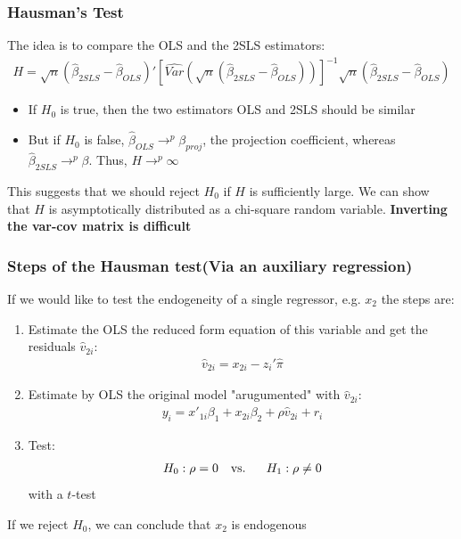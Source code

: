\documentclass[a4paper,twoside,11pt]{article}
\begin{document}
\subsubsection{Hausman's Test}
The idea is to compare the OLS and the 2SLS estimators:
\begin{equation*}
\begin{aligned}
H = \sqrt{n}(\hat{\beta}_{2SLS} - \hat{\beta}_{OLS})' [\widehat{Var}(\sqrt{n} (\hat{\beta}_{2SLS} - \hat{\beta}_{OLS}))]^{-1} \sqrt{n} (\hat{\beta}_{2SLS} - \hat{\beta}_{OLS})
\end{aligned} 
\end{equation*}
\begin{itemize}
    \item If $H_0$ is true, then the two estimators OLS and 2SLS should be similar
    \item But if $H_0$ is false, $\hat{\beta}_{OLS} \rightarrow^p \beta_{proj}$, the projection coefficient, whereas $\hat{\beta}_{2SLS} \rightarrow^p \beta$. Thus, $H \rightarrow^p \infty$
\end{itemize}
This suggests that we should reject $H_0$ if $H$ is sufficiently large. 
\newline
\newline
We can show that $H$ is asymptotically distributed as a chi-square random variable.
\newline
\textbf{Inverting the var-cov matrix is difficult}
\subsubsection{Steps of the Hausman test(Via an auxiliary regression)}
If we would like to test the endogeneity of a single regressor, e.g. $x_2$ the steps are:
\begin{enumerate}
    \item Estimate the OLS the reduced form equation of this variable and get the residuals $\hat{v}_{2i}:$
\newline
\begin{equation*}
\begin{aligned}
\hat{v}_{2i} = x_{2i} - z_i' \hat{\pi}
\end{aligned} 
\end{equation*}
    \item Estimate by OLS the original model "arugumented" with $\hat{v}_{2i}$:
\newline
\begin{equation*}
\begin{aligned}
y_i = x'_{1i} \beta_1 + x_{2i} \beta_2 + \rho \hat{v}_{2i} + r_i
\end{aligned} 
\end{equation*}
    \item Test:
\newline
\begin{equation*}
\begin{aligned}
H_0 : \rho =  0    \ \ \ \textmd{vs.} \ \ \ \ \ H_1: \rho \ne 0
\end{aligned} 
\end{equation*}
with a $t$-test
\end{enumerate}
If we reject $H_0$, we can conclude that $x_2$ is endogenous
\end{document}
